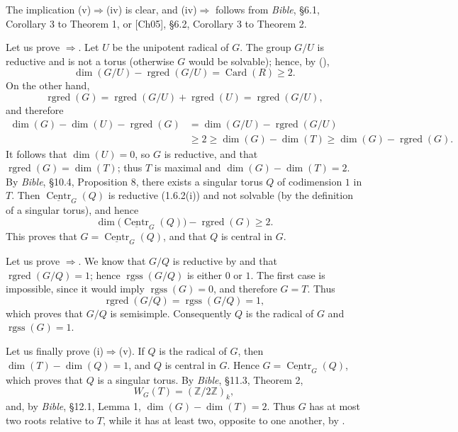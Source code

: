 The implication (v)\(\Rightarrow\)(iv) is clear, and
(iv)\(\Rightarrow\) follows from \emph{Bible}, §6.1, Corollary 3 to
Theorem 1, or [Ch05], §6.2, Corollary 3 to Theorem 2.

Let us prove \(\Rightarrow\).  Let \(U\) be the unipotent radical
of \(G\).  The group \(G/U\) is reductive and is not a torus (otherwise
\(G\) would be solvable); hence, by (),
\[
  \dim(G/U)-\operatorname{rgred}(G/U)
  =
  \operatorname{Card}(R)
  \geq 2.
\]
On the other hand,
\[
  \operatorname{rgred}(G)
  =
  \operatorname{rgred}(G/U)+\operatorname{rgred}(U)
  =
  \operatorname{rgred}(G/U),
\]
and therefore
\[
\begin{aligned}
  \dim(G)-\dim(U)-\operatorname{rgred}(G)
    &=\dim(G/U)-\operatorname{rgred}(G/U)\\
    &\geq 2
     \geq \dim(G)-\dim(T)
     \geq \dim(G)-\operatorname{rgred}(G).
\end{aligned}
\]
It follows that \(\dim(U)=0\), so \(G\) is reductive, and that
\(\operatorname{rgred}(G)=\dim(T)\); thus \(T\) is maximal and
\(\dim(G)-\dim(T)=2\).  By \emph{Bible}, §10.4, Proposition 8, there
exists a singular torus \(Q\) of codimension \(1\) in \(T\).  Then
\(\underline{\operatorname{Centr}}_{G}(Q)\) is reductive (1.6.2(i)) and
not solvable (by the definition of a singular torus), and hence
\[
  \dim\bigl(\underline{\operatorname{Centr}}_{G}(Q)\bigr)
  -\operatorname{rgred}(G)\geq 2.
\]
This proves that
\(G=\underline{\operatorname{Centr}}_{G}(Q)\), and that \(Q\) is central
in \(G\).

Let us prove \(\Rightarrow\).  We know that \(G/Q\) is reductive
by  and that \(\operatorname{rgred}(G/Q)=1\); hence
\(\operatorname{rgss}(G/Q)\) is either \(0\) or \(1\).  The first case is
impossible, since it would imply \(\operatorname{rgss}(G)=0\), and
therefore \(G=T\).  Thus
\[
  \operatorname{rgred}(G/Q)=\operatorname{rgss}(G/Q)=1,
\]
which proves that \(G/Q\) is semisimple.  Consequently \(Q\) is the
radical of \(G\) and \(\operatorname{rgss}(G)=1\).


Let us finally prove (i)\(\Rightarrow\)(v).  If \(Q\) is the radical of
\(G\), then
\(\dim(T)-\dim(Q)=1\), and \(Q\) is central in \(G\).  Hence
\(G=\underline{\operatorname{Centr}}_{G}(Q)\), which proves that \(Q\)
is a singular torus.  By \emph{Bible}, §11.3, Theorem 2,
\[
  W_G(T)=(\mathbb Z/2\mathbb Z)_k,
\]
and, by \emph{Bible}, §12.1, Lemma 1,
\(\dim(G)-\dim(T)=2\).  Thus \(G\) has at most two roots relative to
\(T\), while it has at least two, opposite to one another, by .

